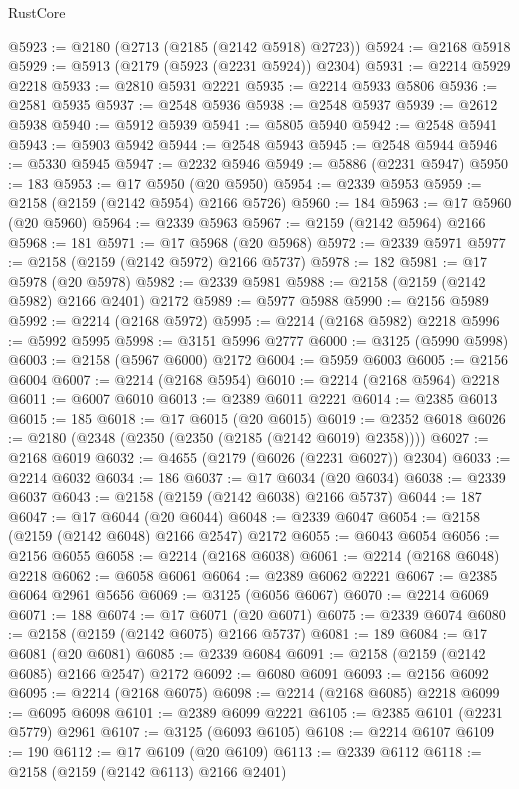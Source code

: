 \begin{lexlean}{RustCore}
\begin{coremodule}
@5923 := @2180 (@2713 (@2185 (@2142 @5918) @2723))
@5924 := @2168 @5918
@5929 := @5913 (@2179 (@5923 (@2231 @5924)) @2304)
@5931 := @2214 @5929 @2218
@5933 := @2810 @5931 @2221
@5935 := @2214 @5933 @5806
@5936 := @2581 @5935
@5937 := @2548 @5936
@5938 := @2548 @5937
@5939 := @2612 @5938
@5940 := @5912 @5939
@5941 := @5805 @5940
@5942 := @2548 @5941
@5943 := @5903 @5942
@5944 := @2548 @5943
@5945 := @2548 @5944
@5946 := @5330 @5945
@5947 := @2232 @5946
@5949 := @5886 (@2231 @5947)
@5950 := 183
@5953 := @17 @5950 (@20 @5950)
@5954 := @2339 @5953
@5959 := @2158 (@2159 (@2142 @5954) @2166 @5726)
@5960 := 184
@5963 := @17 @5960 (@20 @5960)
@5964 := @2339 @5963
@5967 := @2159 (@2142 @5964) @2166
@5968 := 181
@5971 := @17 @5968 (@20 @5968)
@5972 := @2339 @5971
@5977 := @2158 (@2159 (@2142 @5972) @2166 @5737)
@5978 := 182
@5981 := @17 @5978 (@20 @5978)
@5982 := @2339 @5981
@5988 := @2158 (@2159 (@2142 @5982) @2166 @2401) @2172
@5989 := @5977 @5988
@5990 := @2156 @5989
@5992 := @2214 (@2168 @5972)
@5995 := @2214 (@2168 @5982) @2218
@5996 := @5992 @5995
@5998 := @3151 @5996 @2777
@6000 := @3125 (@5990 @5998)
@6003 := @2158 (@5967 @6000) @2172
@6004 := @5959 @6003
@6005 := @2156 @6004
@6007 := @2214 (@2168 @5954)
@6010 := @2214 (@2168 @5964) @2218
@6011 := @6007 @6010
@6013 := @2389 @6011 @2221
@6014 := @2385 @6013
@6015 := 185
@6018 := @17 @6015 (@20 @6015)
@6019 := @2352 @6018
@6026 := @2180 (@2348 (@2350 (@2350 (@2185 (@2142 @6019) @2358))))
@6027 := @2168 @6019
@6032 := @4655 (@2179 (@6026 (@2231 @6027)) @2304)
@6033 := @2214 @6032
@6034 := 186
@6037 := @17 @6034 (@20 @6034)
@6038 := @2339 @6037
@6043 := @2158 (@2159 (@2142 @6038) @2166 @5737)
@6044 := 187
@6047 := @17 @6044 (@20 @6044)
@6048 := @2339 @6047
@6054 := @2158 (@2159 (@2142 @6048) @2166 @2547) @2172
@6055 := @6043 @6054
@6056 := @2156 @6055
@6058 := @2214 (@2168 @6038)
@6061 := @2214 (@2168 @6048) @2218
@6062 := @6058 @6061
@6064 := @2389 @6062 @2221
@6067 := @2385 @6064 @2961 @5656
@6069 := @3125 (@6056 @6067)
@6070 := @2214 @6069
@6071 := 188
@6074 := @17 @6071 (@20 @6071)
@6075 := @2339 @6074
@6080 := @2158 (@2159 (@2142 @6075) @2166 @5737)
@6081 := 189
@6084 := @17 @6081 (@20 @6081)
@6085 := @2339 @6084
@6091 := @2158 (@2159 (@2142 @6085) @2166 @2547) @2172
@6092 := @6080 @6091
@6093 := @2156 @6092
@6095 := @2214 (@2168 @6075)
@6098 := @2214 (@2168 @6085) @2218
@6099 := @6095 @6098
@6101 := @2389 @6099 @2221
@6105 := @2385 @6101 (@2231 @5779) @2961
@6107 := @3125 (@6093 @6105)
@6108 := @2214 @6107
@6109 := 190
@6112 := @17 @6109 (@20 @6109)
@6113 := @2339 @6112
@6118 := @2158 (@2159 (@2142 @6113) @2166 @2401)

\end{coremodule}
\end{lexlean}
